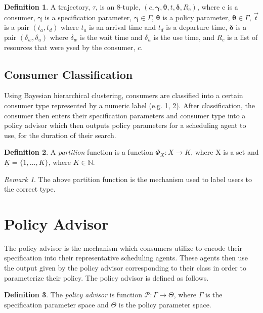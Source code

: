 \documentclass{article}
\theoremstyle{definition}
\newtheorem{definition}{Definition}[section]
\theoremstyle{remark}
\newtheorem*{remark}{Remark}
\begin{document}
    \begin{definition}
    A trajectory, $\tau$, is an 8-tuple, $(c, \mathbf{\gamma}, \mathbf{\theta}, t, \mathbf{\delta}, R_{c})$, where c is a consumer, $\mathbf{\gamma}$ is a specification parameter,
    $\mathbf{\gamma} \in \Gamma$, $\mathbf{\theta}$ is a policy parameter, $\mathbf{\theta} \in \Gamma$, $\vec{t}$
    is a pair $(t_{a}, t_{d})$ where $t_{a}$ is an arrival time and $t_{d}$ is a departure time, $\mathbf{\delta}$
    is a pair $(\delta_{w}, \delta_{u})$ where $\delta_{w}$ is the wait time and $\delta_{u}$ is the use time, and
    $R_{c}$ is a list of resources that were ysed by the consumer, $c$.
    \end{definition}


	\subsection{Consumer Classification}
	Using Bayesian hierarchical clustering, consumers are classified into a certain consumer type represented by a
    numeric label (e.g. 1, 2). After classification, the consumer then enters their specification parameters and
    consumer type into a policy advisor which then outputs policy parameters for a scheduling agent to use, for
    the duration of their search.

    \begin{definition}
        A \emph{partition} function is a function $\Phi_{X}: X \rightarrow \underline{K}$, where X is a
        set and $\underline{K} = \{1, \ldots, K\}$, where $K \in \mathbb{N}$.
    \end{definition}

    \begin{remark}
        The above partition function is the mechanism used to label users to the correct type.
    \end{remark}

	\section{Policy Advisor}
	The policy advisor is the mechanism which consumers utilize to encode their specification into their
    representative scheduling agents. These agents then use the output given by the policy advisor corresponding
    to their class in order to parameterize their policy. The policy advisor is defined as follows.

    \begin{definition}
        The \emph{policy advisor} is function $\mathcal{P}: \Gamma \rightarrow \Theta$, where $\Gamma$ is the specification
		parameter space and $\Theta$ is the policy parameter space.
    \end{definition}
\end{document}
